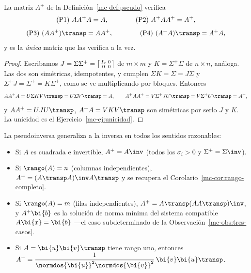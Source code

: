 \begin{proposition}\label{mc-prop:penrose}
La matriz $A^{+}$ de la Definición~\ref{mc-def:pseudo} verifica
\[
\textup{(P1)}\ AA^{+}A=A,
\qquad\qquad
\textup{(P2)}\ A^{+}AA^{+}=A^{+},
\]
\[
\textup{(P3)}\ (AA^{+})\transp=AA^{+},
\qquad\qquad
\textup{(P4)}\ (A^{+}A)\transp=A^{+}A,
\]
y es la \emph{única} matriz que las verifica a la vez.
\end{proposition}

\begin{proof}
Escribamos $J=\Sigma\Sigma^{+}=\begin{bsmallmatrix}I_r&0\\0&0\end{bsmallmatrix}$
de $m\times m$ y $K=\Sigma^{+}\Sigma$ de $n\times n$, análoga. Las dos son
simétricas, idempotentes, y cumplen $\Sigma K=\Sigma=J\Sigma$ y
$\Sigma^{+}J=\Sigma^{+}=K\Sigma^{+}$, como se ve multiplicando por bloques.
Entonces
\[
AA^{+}A=U\Sigma K V\transp=U\Sigma V\transp=A,
\qquad
A^{+}AA^{+}=V\Sigma^{+}JU\transp=V\Sigma^{+}U\transp=A^{+},
\]
y $AA^{+}=UJU\transp$, $A^{+}A=VKV\transp$ son simétricas por serlo $J$ y $K$.
La unicidad es el Ejercicio~\ref{mc-ej:unicidad}.
\end{proof}

\begin{remark}\label{mc-obs:casos-pseudo}
La pseudoinversa generaliza a la inversa en todos los sentidos razonables:
\begin{itemize}[leftmargin=*,itemsep=1pt]
\item Si $A$ es cuadrada e invertible, $A^{+}=A\inv$ (todos los
$\sigma_i>0$ y $\Sigma^{+}=\Sigma\inv$).
\item Si $\rango(A)=n$ (columnas independientes), $A^{+}=(A\transp A)\inv A\transp$
y se recupera el Corolario~\ref{mc-cor:rango-completo}.
\item Si $\rango(A)=m$ (filas independientes), $A^{+}=A\transp(AA\transp)\inv$,
y $A^{+}\bi{b}$ es la solución de norma mínima del sistema compatible
$A\bi{x}=\bi{b}$ ---el caso subdeterminado de la
Observación~\ref{mc-obs:tres-casos}.
\item Si $A=\bi{u}\bi{v}\transp$ tiene rango uno, entonces
$A^{+}=\dfrac{1}{\normdos{\bi{u}}^2\normdos{\bi{v}}^2}\,\bi{v}\bi{u}\transp$.
\end{itemize}
\end{remark}

